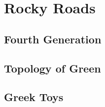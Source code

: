 \chapter{Rocky Roads}
\section{Fourth Generation}
\lipsum[1-6]
\section{Topology of Green}
\lipsum[1-3]
\section{Greek Toys}
\lipsum[1-4]